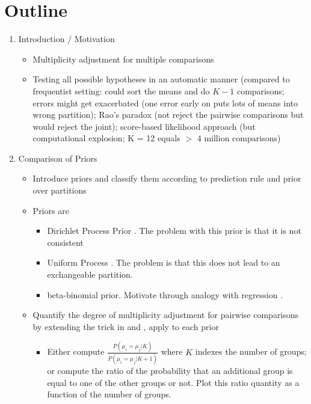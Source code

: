 \documentclass[11pt,a4paper]{article}
\theoremstyle{definition} %
\theoremstyle{case}
\begin{document}
\section*{Outline}
\begin{enumerate}
    \item Introduction / Motivation
    \begin{itemize}
        \item Multiplicity adjustment for multiple comparisons
        \item Testing all possible hypotheses in an automatic manner (compared to frequentist setting: could sort the means and do $K - 1$ comparisons; errors might get exacerbated (one error early on puts lots of means into wrong partition); Rao's paradox (not reject the pairwise comparisons but would reject the joint); score-based likelihood approach (but computational explosion; K = 12 equals $>$ 4 million comparisons)
    \end{itemize}
    \item Comparison of Priors
    \begin{itemize}
        \item Introduce priors and classify them according to prediction rule and prior over partitions
        \item Priors are
        \begin{itemize}
            \item Dirichlet Process Prior \parencite{gopalan1998bayesian}. The problem with this prior is that it is not consistent \parencite{miller2013simple, miller2018mixture}
            \item Uniform Process \parencite{wallach2010alternative}. The problem is that this does not lead to an exchangeable partition.
            \item beta-binomial prior. Motivate through analogy with regression \parencite{scott2006exploration, scott2010bayes}.
        \end{itemize}
        \item Quantify the degree of multiplicity adjustment for pairwise comparisons by extending the trick in \textcite{scott2010bayes} and \textcite{li2016role}, apply to each prior
        \begin{itemize}
            \item Either compute $\frac{P(\mu_i = \mu_j | K)}{P(\mu_i = \mu_j | K + 1)}$ where $K$ indexes the number of groups; or compute the ratio of the probability that an additional group is equal to one of the other groups or not. Plot this ratio quantity as a function of the number of groups.

\end{itemize}
\end{itemize}
\end{enumerate}
\end{document}

